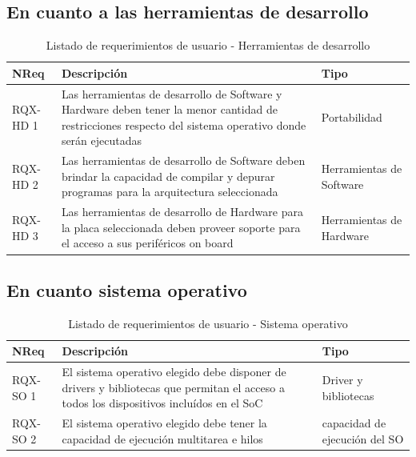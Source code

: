 		\newpage
			
		\subsection{En cuanto a las herramientas de desarrollo}
		\begin{table}[h]
		\centering
		\begin{tabular}{ p{2.5cm} p{8cm} p{3cm} }
		\hline 
		\rowcolor[gray]{0.8} N\textordmasculine Req & Descripción  & Tipo\\
		\hline 
		RQX-HD 1 &  Las herramientas de desarrollo de Software y Hardware deben tener la menor cantidad de restricciones respecto del sistema operativo donde serán ejecutadas & Portabilidad\\
		\hline 
		RQX-HD 2 &  Las herramientas de desarrollo de Software deben brindar la capacidad de compilar y depurar programas para la arquitectura seleccionada &
		Herramientas de Software\\
		\hline
		RQX-HD 3 &  Las herramientas de desarrollo de Hardware para la placa seleccionada deben proveer soporte para el acceso a sus periféricos on board &
		Herramientas de Hardware\\ 
		\hline 
		\end{tabular}
		\caption{Listado de requerimientos de usuario - Herramientas de desarrollo}
		\label{tab:requsr3}
		\end{table}
		
		\subsection{En cuanto sistema operativo} 	 
		\begin{table}[h]
		\centering
		\begin{tabular}{ p{2.5cm} p{8cm} p{3cm} }
		\hline 
		\rowcolor[gray]{0.8} N\textordmasculine Req & Descripción  & Tipo\\
		\hline 
		RQX-SO 1 &  El sistema operativo elegido debe disponer de drivers y bibliotecas que permitan el acceso a todos los dispositivos incluídos en el SoC &
		Driver y bibliotecas\\
		\hline 
		RQX-SO 2 &  El sistema operativo elegido debe tener la capacidad de ejecución multitarea e hilos & capacidad de ejecución del SO\\ 
		\hline 
		\end{tabular}
		\caption{Listado de requerimientos de usuario - Sistema operativo}
		\label{tab:requsr4}
		\end{table}
	
